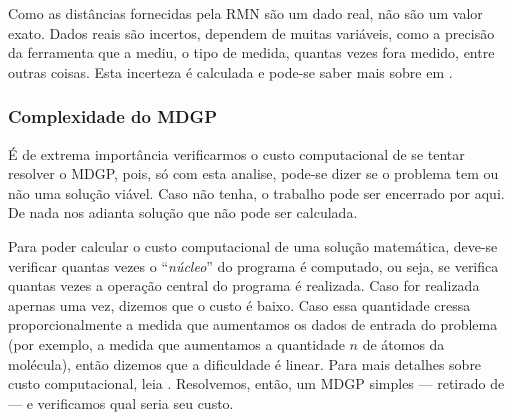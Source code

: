 \documentclass[a4paper,12pt]{article}
\begin{document}
	Como as distâncias fornecidas pela RMN são um dado real, não são um valor exato. Dados reais são incertos, dependem de muitas variáveis, como a precisão da ferramenta que a mediu, o tipo de medida, quantas vezes fora medido, entre outras coisas. Esta incerteza é calculada e pode-se saber mais sobre em \cite{EstatisticaTratamentoDeDados}.
	
	\subsubsection*{Complexidade do MDGP}
	É de extrema importância verificarmos o custo computacional de se tentar resolver o MDGP, pois, só com esta analise, pode-se dizer se o problema tem ou não uma solução viável. Caso não tenha, o trabalho pode ser encerrado por aqui. De nada nos adianta solução que não pode ser calculada.
	
	Para poder calcular o custo computacional de uma solução matemática, deve-se verificar quantas vezes o ``\textit{núcleo}'' do programa é computado, ou seja, se verifica quantas vezes a operação central do programa é realizada. Caso for realizada apernas uma vez, dizemos que o custo é baixo. Caso essa quantidade cressa proporcionalmente a medida que aumentamos os dados de entrada do problema (por exemplo, a medida que aumentamos a quantidade $n$ de átomos da molécula), então dizemos que a dificuldade é linear. Para mais detalhes sobre custo computacional, leia \cite{ComplexidadeComp}. Resolvemos, então, um MDGP simples --- retirado de \cite{carlileBook31Coloquio} --- e verificamos qual seria seu custo.
	
\end{document}
